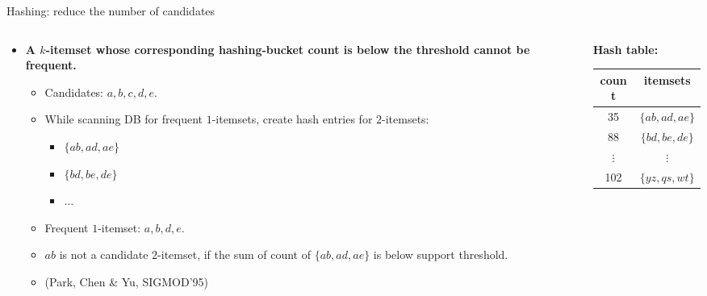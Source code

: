 \documentclass[aspectratio=169,t,xcolor=dvipsnames]{beamer}
\begin{document}
  {
    \begin{frame}{Hashing: reduce the number of candidates}
    \begin{columns}
      \begin{column}{0.6\textwidth}
      \begin{itemize}
        \item \textbf{A $k$-itemset whose corresponding hashing-bucket count is below the threshold cannot be frequent.}
        \begin{itemize}
          \item Candidates: $a,b,c,d,e$.
          \item While scanning DB for frequent $1$-itemsets, create hash entries for $2$-itemsets:
          \begin{itemize}
            \item $\{ab,ad,ae\}$
            \item $\{bd,be,de\}$
            \item $\ldots$
          \end{itemize}
          \item Frequent $1$-itemset: $a,b,d,e$.
          \item $ab$ is not a candidate $2$-itemset, if the sum of count of $\{ab, ad, ae\}$ is below support threshold.
          \item (Park, Chen \& Yu, SIGMOD'95)
        \end{itemize}
      \end{itemize}
      \end{column}
      \begin{column}{0.3\textwidth}
      \centering
      \textbf{Hash table:}\\
      \begin{tabular}{| c | c |}
      \hline
      count & itemsets \\\hline
      35 & $\{ab,ad,ae\}$\\\hline
      88 & $\{bd,be,de\}$\\\hline
      $\vdots$ & $\vdots$\\\hline
      102 & $\{yz,qs,wt\}$\\\hline
      \end{tabular}
      \end{column}
    \end{columns}
    \end{frame}
  }
\end{document}
